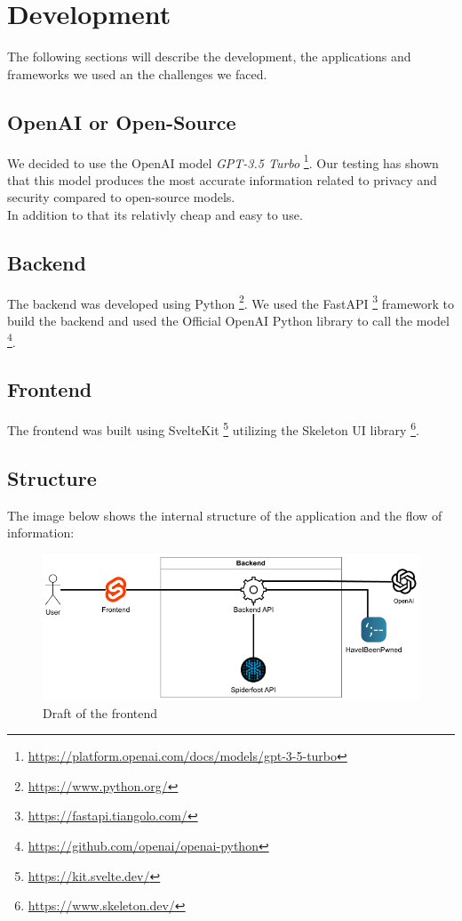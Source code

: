 \documentclass[
    a4paper,
    pagesize,
	pdftex,
    12pt,
]{scrartcl}
\begin{document}
\section{Development}
The following sections will describe the development, the applications and frameworks we used an the challenges we faced.

\subsection{OpenAI or Open-Source}
We decided to use the OpenAI model \textit{GPT-3.5 Turbo} \footnote{\url{https://platform.openai.com/docs/models/gpt-3-5-turbo}}. Our testing has shown that this model produces the most accurate information related to privacy and security compared to open-source models.\\
In addition to that its relativly cheap and easy to use.

\subsection{Backend}
The backend was developed using Python \footnote{\url{https://www.python.org/}}. We used the FastAPI \footnote{\url{https://fastapi.tiangolo.com/}} framework to build the backend and used the Official OpenAI Python library to call the model \footnote{\url{https://github.com/openai/openai-python}}.

\subsection{Frontend}
The frontend was built using SvelteKit \footnote{\url{https://kit.svelte.dev/}} utilizing the Skeleton UI library \footnote{\url{https://www.skeleton.dev/}}.

\subsection{Structure}
The image below shows the internal structure of the application and the flow of information:
\begin{figure}[H]
	\centering
	\includegraphics[width=14cm]{Structure.png}
	\caption{Draft of the frontend}
	\label{fig:structure}
\end{figure} 
\end{document}
